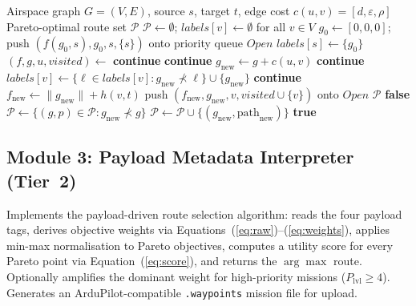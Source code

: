 \documentclass{ssnreview}
\begin{document}
\begin{algorithm}[H]
\caption{NAMOA* -- Multi-Objective A*/Dijkstra Pareto Front Construction (Tier~1)}\label{alg:tier1}
\begin{algorithmic}[1]
\Require Airspace graph $G=(V,E)$, source $s$, target $t$, edge cost $c(u,v)=[d,\varepsilon,\rho]$
\Ensure Pareto-optimal route set $\mathcal{P}$
\State $\mathcal{P} \gets \emptyset$; \quad $\mathit{labels}[v] \gets \emptyset$ for all $v \in V$
\State $g_0 \gets [0,0,0]$; \quad push $(f(g_0,s), g_0, s, \{s\})$ onto priority queue $\mathit{Open}$
\State $\mathit{labels}[s] \gets \{g_0\}$
    \State $(f, g, u, \mathit{visited}) \gets$ 
     
        \State \textbf{continue}
    \EndIf
        \State {}
        \State \textbf{continue}
    \EndIf
        \State $g_{\mathrm{new}} \gets g + c(u,v)$
            \State \textbf{continue} 
        \EndIf
        \State $\mathit{labels}[v] \gets \{\ell \in \mathit{labels}[v] : g_{\mathrm{new}} \not\prec \ell\} \cup \{g_{\mathrm{new}}\}$
            \State \textbf{continue}
        \EndIf
        \State $f_{\mathrm{new}} \gets \lVert g_{\mathrm{new}} \rVert + h(v,t)$
        \State push $(f_{\mathrm{new}}, g_{\mathrm{new}}, v, \mathit{visited} \cup \{v\})$ onto $\mathit{Open}$
    \EndFor
\EndWhile
\State \Return $\mathcal{P}$
\Statex
{}
     \Return \textbf{false} \EndIf
    \State $\mathcal{P} \gets \{(g,p) \in \mathcal{P} : g_{\mathrm{new}} \not\prec g\}$
    \State $\mathcal{P} \gets \mathcal{P} \cup \{(g_{\mathrm{new}}, \mathrm{path}_{\mathrm{new}})\}$
    \State \Return \textbf{true}
\EndProcedure
\end{algorithmic}
\end{algorithm}

\subsection{Module 3: Payload Metadata Interpreter (Tier~2)}
Implements the payload-driven route selection algorithm: reads the four payload tags,
derives objective weights via Equations~(\ref{eq:raw})--(\ref{eq:weights}), applies
min-max normalisation to Pareto objectives, computes a utility score for every Pareto
point via Equation~(\ref{eq:score}), and returns the $\arg\max$ route. Optionally
amplifies the dominant weight for high-priority missions ($P_\mathrm{lvl} \geq 4$).
Generates an ArduPilot-compatible \texttt{.waypoints} mission file for upload.
\end{document}
